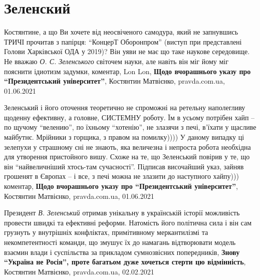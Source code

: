  
 
 
 
 
\chapter{Зеленский}

Костянтине, а що Ви хочете від неосвіченого самодура, який не запнувшись ТРИЧІ
прочитав з папірця: \enquote{КонцерТ Оборонпром} (виступ при представлені Голови
Харківської ОДА у 2019)?
Він уяви не має що таке наукове середовище. Не вважаю \emph{О. С. Зеленського} світочем
науки, але навіть він міг йому міг пояснити ідиотизм задумки,
коментар, Lon Lon, \textbf{Щодо вчорашнього указу про \enquote{Президентський університет}}, 
Костянтин Матвієнко, pravda.com.ua, 01.06.2021

Зеленський і його оточення теоретично не спроможні на ретельну наполегливу
щоденну ефективну, а головне, СИСТЕМНУ роботу. Їм в усьому потрібен хайп – по
щучому \enquote{велению}, по їхньому \enquote{хотенію}, не злазячи з печі, в'їхати у щасливе
майбутнє. Мрійники з горщика, з правом на помилку))))
У даному випадку ці зелепухи у страшному сні не знають, яка величезна і
непроста робота необхідна для утворення пристойного вишу. Схоже на те, що
Зеленський повірив у те, що він \enquote{найвеличніший хтось-там сучасності}. Підписав
височайший указ, зайняв грошенят в Європах – і все, з печі можна не злазити до
наступного хайпу)))
коментар, \textbf{Щодо вчорашнього указу про \enquote{Президентський університет}}, 
Костянтин Матвієнко, pravda.com.ua, 01.06.2021

Президент \emph{В. Зеленський} отримав унікальну в українській історії можливість
провести швидкі та ефективні реформи. Натомість його політична сила і він сам
грузнуть у внутрішніх конфліктах, примітивному меркантилізмі та
некомпетентності команди, що змушує їх до намагань відтворювати модель взаємин
влади і суспільства за прикладом сумнозвісних попередників,
\textbf{Знову \enquote{Україна не Росія}, проте багатьом дуже хочеться стерти цю відмінність},
Костянтин Матвієнко, pravda.com.ua, 02.02.2021


